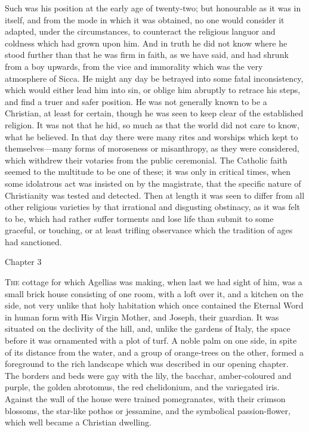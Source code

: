 Such was his position at the early age of twenty-two; but
honourable as it was in itself, and from the mode in which it was
obtained, no one would consider it adapted, under the circumstances,
to counteract the religious languor and coldness which had grown upon
him. And in truth he did not know where he stood further than that he
was firm in faith, as we have said, and had shrunk from a boy upwards,
from the vice and immorality which was the very atmosphere of
Sicca. He might any day be betrayed into some fatal inconsistency,
which would either lead him into sin, or oblige him abruptly to
retrace his steps, and find a truer and safer position. He was not
generally known to be a Christian, at least for certain, though he was
seen to keep clear of the established religion. It was not that he
hid, so much as that the world did not care to know, what he believed.
In that day there were many rites and worships which kept to
themselves—many forms of moroseness or misanthropy, as they were
considered, which withdrew their votaries from the public ceremonial.
The Catholic faith seemed to the multitude to be one of these; it was
only in critical times, when some idolatrous act was insisted on by
the magistrate, that the specific nature of Christianity was tested
and detected. Then at length it was seen to differ from all other
religious varieties by that irrational and disgusting obstinacy, as it
was felt to be, which had rather suffer torments and lose life than
submit to some graceful, or touching, or at least trifling observance
which the tradition of ages had sanctioned.

Chapter 3


T\textsc{he} cottage for which Agellias was making, when last we had
sight of him, was a small brick house consisting of one room, with a
loft over it, and a kitchen on the side, not very unlike that holy
habitation which once contained the Eternal Word in human form with
His Virgin Mother, and Joseph, their guardian. It was situated on the
declivity of the hill, and, unlike the gardens of Italy, the space
before it was ornamented with a plot of turf. A noble palm on one
side, in spite of its distance from the water, and a group of
orange-trees on the other, formed a foreground to the rich landscape
which was described in our opening chapter. The borders and beds were
gay with the lily, the bacchar, amber-coloured and purple, the golden
abrotomus, the red chelidonium, and the variegated iris. Against the
wall of the house were trained pomegranates, with their crimson
blossoms, the star-like pothos or jessamine, and the symbolical
passion-flower, which well became a Christian dwelling.

